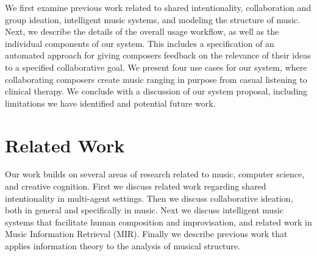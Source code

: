 \documentclass[final,authoryear,5p,times,twocolumn]{elsarticle}
\begin{document}
We first examine previous work related to shared intentionality, collaboration and group ideation, intelligent music systems, and modeling the structure of music. Next, we describe the details of the overall usage workflow, as well as the individual components of our system. This includes a specification of an automated approach for giving composers feedback on the relevance of their ideas to a specified collaborative goal. We present four use cases for our system, where collaborating composers create music ranging in purpose from casual listening to clinical therapy. We conclude with a discussion of our system proposal, including limitations we have identified and potential future work.



\section{Related Work}


Our work builds on several areas of research related to music, computer science, and creative cognition. First we discuss related work regarding shared intentionality in multi-agent settings. Then we discuss collaborative ideation, both in general and specifically in music. Next we discuss intelligent music systems that facilitate human composition and improvisation, and related work in Music Information Retrieval (MIR). Finally we describe previous work that applies information theory to the analysis of musical structure.
\end{document}

